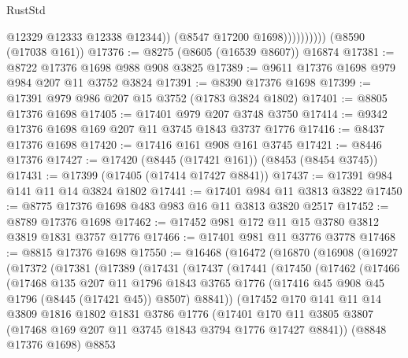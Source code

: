 \begin{lexlean}{RustStd}
\begin{coremodule}
                          @12329
                          @12333
                          @12338
                          @12344))
                      (@8547 @17200 @1698))))))))))
    (@8590 (@17038 @161))
@17376 := @8275 (@8605 (@16539 @8607)) @16874
@17381 := @8722 @17376 @1698 @988 @908 @3825
@17389 := @9611 @17376 @1698 @979 @984 @207 @11 @3752 @3824
@17391 := @8390 @17376 @1698
@17399 := @17391 @979 @986 @207 @15 @3752 (@1783 @3824 @1802)
@17401 := @8805 @17376 @1698
@17405 := @17401 @979 @207 @3748 @3750
@17414 := @9342 @17376 @1698 @169 @207 @11 @3745 @1843 @3737 @1776
@17416 := @8437 @17376 @1698
@17420 := @17416 @161 @908 @161 @3745
@17421 := @8446 @17376
@17427 := @17420 (@8445 (@17421 @161)) (@8453 (@8454 @3745))
@17431 := @17399 (@17405 (@17414 @17427 @8841))
@17437 := @17391 @984 @141 @11 @14 @3824 @1802
@17441 := @17401 @984 @11 @3813 @3822
@17450 := @8775 @17376 @1698 @483 @983 @16 @11 @3813 @3820 @2517
@17452 := @8789 @17376 @1698
@17462 := @17452 @981 @172 @11 @15 @3780 @3812 @3819 @1831 @3757 @1776
@17466 := @17401 @981 @11 @3776 @3778
@17468 := @8815 @17376 @1698
@17550 := @16468
    (@16472
      (@16870
        (@16908
          (@16927
            (@17372
              (@17381
                (@17389
                  (@17431
                    (@17437
                      (@17441
                        (@17450
                          (@17462
                            (@17466
                              (@17468
                                @135
                                @207
                                @11
                                @1796
                                @1843
                                @3765
                                @1776
                                (@17416 @45 @908 @45 @1796 (@8445 (@17421 @45)) @8507)
                                @8841))
                            (@17452
                              @170
                              @141
                              @11
                              @14
                              @3809
                              @1816
                              @1802
                              @1831
                              @3786
                              @1776
                              (@17401
                                @170
                                @11
                                @3805
                                @3807
                                (@17468 @169 @207 @11 @3745 @1843 @3794 @1776 @17427 @8841))
                              (@8848 @17376 @1698)
                              @8853

\end{coremodule}
\end{lexlean}
